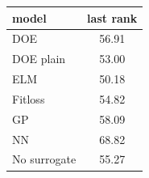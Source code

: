 \begin{tabular}{|lc|}
\hline
model & last rank\\
\hline
DOE & 56.91 \\
DOE plain & 53.00 \\
ELM & 50.18 \\
Fitloss & 54.82 \\
GP & 58.09 \\
NN & 68.82 \\
No surrogate & 55.27 \\
\hline
\end{tabular}
